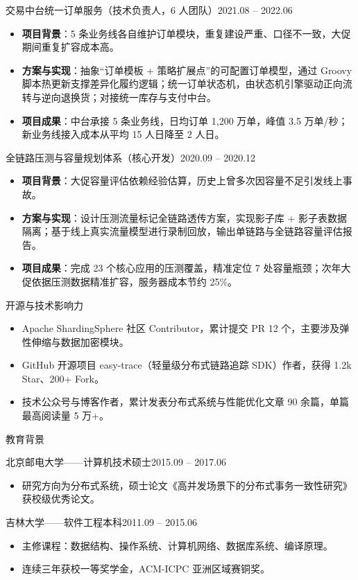 \documentclass[10.5pt,fontset=windows]{ctexart}
\newcommand{\rsection}[1]{%
  \Needspace*{6\baselineskip}%
  \vspace{9pt}%
  {\color{maincolor}\heiti\zihao{4}#1}\par
  \vspace{1pt}{\color{maincolor}\rule{\textwidth}{1pt}}\par
  \vspace{3pt}}
\newcommand{\entryhead}[2]{%
  \Needspace*{3\baselineskip}%
  {\heiti #1}\hfill{\color{graytext}\small #2}\par\vspace{1pt}}
\newcommand{\subhead}[2]{%
  {\heiti #1}\hfill{\color{graytext}\small #2}\par\vspace{1pt}}
\begin{document}
\entryhead{交易中台统一订单服务（技术负责人，6 人团队）}{2021.08 -- 2022.06}
\begin{itemize}
  \item \textbf{项目背景}：5 条业务线各自维护订单模块，重复建设严重、口径不一致，大促期间重复扩容成本高。
  \item \textbf{方案与实现}：抽象“订单模板 + 策略扩展点”的可配置订单模型，通过 Groovy 脚本热更新支撑差异化履约逻辑；统一订单状态机，由状态机引擎驱动正向流转与逆向退换货；对接统一库存与支付中台。
  \item \textbf{项目成果}：中台承接 5 条业务线，日均订单 1,200 万单，峰值 3.5 万单/秒；新业务线接入成本从平均 15 人日降至 2 人日。
\end{itemize}

\entryhead{全链路压测与容量规划体系（核心开发）}{2020.09 -- 2020.12}
\begin{itemize}
  \item \textbf{项目背景}：大促容量评估依赖经验估算，历史上曾多次因容量不足引发线上事故。
  \item \textbf{方案与实现}：设计压测流量标记全链路透传方案，实现影子库 + 影子表数据隔离；基于线上真实流量模型进行录制回放，输出单链路与全链路容量评估报告。
  \item \textbf{项目成果}：完成 23 个核心应用的压测覆盖，精准定位 7 处容量瓶颈；次年大促依据压测数据精准扩容，服务器成本节约 25\%。
\end{itemize}

\rsection{开源与技术影响力}
\begin{itemize}
  \item Apache ShardingSphere 社区 Contributor，累计提交 PR 12 个，主要涉及弹性伸缩与数据加密模块。
  \item GitHub 开源项目 easy-trace（轻量级分布式链路追踪 SDK）作者，获得 1.2k Star、200+ Fork。
  \item 技术公众号与博客作者，累计发表分布式系统与性能优化文章 90 余篇，单篇最高阅读量 5 万+。
\end{itemize}

\rsection{教育背景}
\subhead{北京邮电大学\quad ——\quad 计算机技术\quad 硕士}{2015.09 -- 2017.06}
\begin{itemize}
  \item 研究方向为分布式系统，硕士论文《高并发场景下的分布式事务一致性研究》获校级优秀论文。
\end{itemize}
\subhead{吉林大学\quad ——\quad 软件工程\quad 本科}{2011.09 -- 2015.06}
\begin{itemize}
  \item 主修课程：数据结构、操作系统、计算机网络、数据库系统、编译原理。
  \item 连续三年获校一等奖学金，ACM-ICPC 亚洲区域赛铜奖。
\end{itemize}
\end{document}
